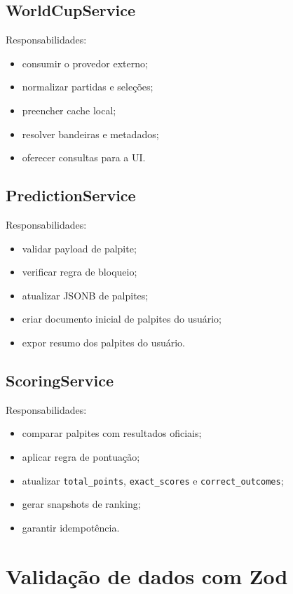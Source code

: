 \documentclass[12pt,a4paper]{article}
\begin{document}
\subsection{WorldCupService}

Responsabilidades:
\begin{itemize}
  \item consumir o provedor externo;
  \item normalizar partidas e seleções;
  \item preencher cache local;
  \item resolver bandeiras e metadados;
  \item oferecer consultas para a UI.
\end{itemize}

\subsection{PredictionService}

Responsabilidades:
\begin{itemize}
  \item validar payload de palpite;
  \item verificar regra de bloqueio;
  \item atualizar JSONB de palpites;
  \item criar documento inicial de palpites do usuário;
  \item expor resumo dos palpites do usuário.
\end{itemize}

\subsection{ScoringService}

Responsabilidades:
\begin{itemize}
  \item comparar palpites com resultados oficiais;
  \item aplicar regra de pontuação;
  \item atualizar \texttt{total\_points}, \texttt{exact\_scores} e \texttt{correct\_outcomes};
  \item gerar snapshots de ranking;
  \item garantir idempotência.
\end{itemize}

\section{Validação de dados com Zod}
\end{document}
